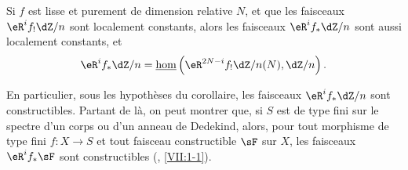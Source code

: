 \begin{corollary}\label{I:6-4-1}
Si $f$ est lisse et purement de dimension relative $N$, et que les faisceaux 
$\eR^i f_! \dZ/n$ sont localement constants, alors les faisceaux 
$\eR^i f_* \dZ/n$ sont aussi localement constants, et 
\[
  \eR^i f_* \dZ/n = \const\hom\left(\eR^{2 N-i} f_! \dZ/n(N),\dZ/n\right)\text{.}
\]
\end{corollary}

En particulier, sous les hypothèses du corollaire, les faisceaux 
$\eR^i f_* \dZ/n$ sont constructibles. Partant de là, on peut montrer que, si 
$S$ est de type fini sur le spectre d'un corps ou d'un anneau de Dedekind, 
alors, pour tout morphisme de type fini $f:X\to S$ et tout faisceau 
constructible $\sF$ sur $X$, les faisceaux $\eR^i f_* \sF$ sont constructibles 
(, \ref{VII:1-1}). 
